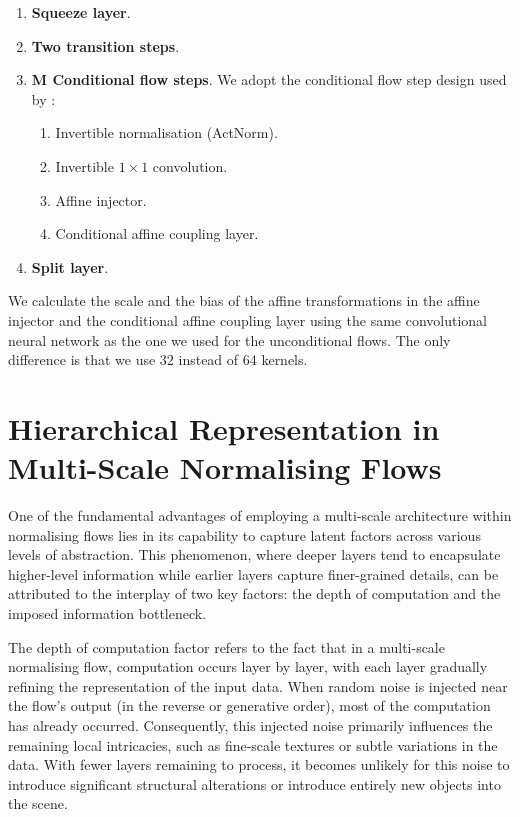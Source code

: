 \begin{enumerate}
    \item \textbf{Squeeze layer}.
    \item \textbf{Two transition steps}.
    \item \textbf{M Conditional flow steps}. We adopt the conditional flow step design used by \cite{SRFLOW}: \begin{enumerate}
        \item Invertible normalisation (ActNorm).
        \item Invertible $1\times 1$ convolution.
        \item Affine injector.
        \item Conditional affine coupling layer.
    \end{enumerate}
    \item \textbf{Split layer}.
\end{enumerate}


We calculate the scale and the bias of the affine transformations in the affine injector and the conditional affine coupling layer using the same convolutional neural network as the one we used for the unconditional flows. The only difference is that we use $32$ instead of $64$ kernels.

\newpage

\section{Hierarchical Representation in Multi-Scale Normalising Flows}\label{ch1:Hierarchical-Representation-in-Multi-Scale-Normalising-Flows}

One of the fundamental advantages of employing a multi-scale architecture within normalising flows lies in its capability to capture latent factors across various levels of abstraction. This phenomenon, where deeper layers tend to encapsulate higher-level information while earlier layers capture finer-grained details, can be attributed to the interplay of two key factors: the depth of computation and the imposed information bottleneck.

The depth of computation factor refers to the fact that in a multi-scale normalising flow, computation occurs layer by layer, with each layer gradually refining the representation of the input data. When random noise is injected near the flow's output (in the reverse or generative order), most of the computation has already occurred. Consequently, this injected noise primarily influences the remaining local intricacies, such as fine-scale textures or subtle variations in the data. With fewer layers remaining to process, it becomes unlikely for this noise to introduce significant structural alterations or introduce entirely new objects into the scene.

